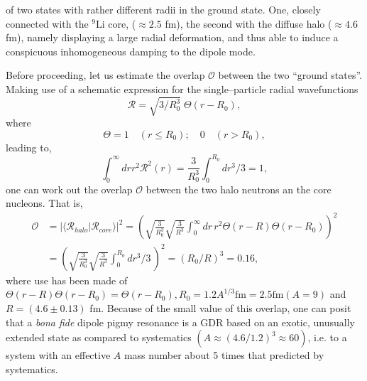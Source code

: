 of two states with rather different radii in the ground state. One, closely connected with the $^{9}$Li core, ($\approx 2.5$ fm), the second with the diffuse halo ($\approx 4.6$ fm), namely displaying a large radial deformation, and thus able to induce a conspicuous inhomogeneous damping to the dipole mode. 


Before proceeding, let us estimate the overlap $\mathscr{O}$ between the two ``ground states''. Making use of a schematic expression for the single--particle radial wavefunctions
\begin{equation}
\mathcal{R}=\sqrt{3/R_0^3}\;\Theta(r-R_0),
\end{equation}
where 
\begin{equation*}
\Theta=1 \quad (r\leq R_0);\quad 0 \quad (r>R_0),
\end{equation*}
leading to,
\begin{equation}
\int_0^{\infty}dr r^2 \mathcal{R}^2(r)=\frac{3}{R_0^3}\int_0^{R_0}dr^3/3=1,
\end{equation}
one can work out the overlap $\mathcal{O}$ between the two halo neutrons an the core nucleons. That is, 
\begin{equation}
\begin{split}
\mathscr{O}&=|\langle\mathcal{R}_{halo}|\mathcal{R}_{core}\rangle|^2=\left(\sqrt{\frac{3}{R_0^3}}\sqrt{\frac{3}{R^3}}\int_0^{\infty}dr\,r^2\Theta(r-R)\Theta(r-R_0)\right)^2\\
&=\left(\sqrt{\frac{3}{R_0^3}}\sqrt{\frac{3}{R^3}}\int_0^{R_0}dr^3/3\,\right)^2=(R_0/R)^3=0.16,
\end{split}
\end{equation}
where use has been made of $\Theta(r-R)\Theta(r-R_0)=\Theta(r-R_0), R_0=1.2A^{1/3} \text{fm}=2.5 \text{fm} (A=9)$ and $R=(4.6\pm 0.13)$ fm.
Because of the small value of this overlap, one can posit that a \textit{bona fide} dipole pigmy resonance is a GDR based on an exotic, unusually extended state as compared to systematics $(A\approx (4.6/1.2)^3\approx 60)$, i.e. to  a system with an effective $A$ mass number about 5 times that predicted by systematics.


